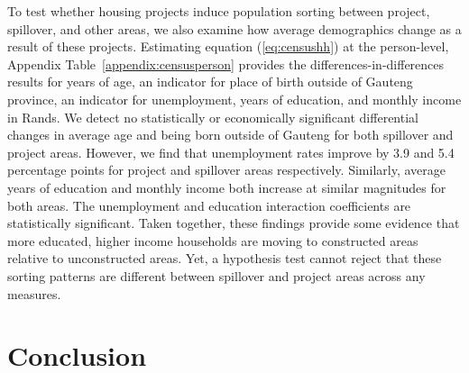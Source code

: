 \documentclass[12pt]{article}
\begin{document}
To test whether housing projects induce population sorting between project, spillover, and other areas, we also examine how average demographics change as a result of these projects.  Estimating equation (\ref{eq:censushh}) at the person-level, Appendix Table~\ref{appendix:censusperson} provides the differences-in-differences results for years of age, an indicator for place of birth outside of Gauteng province, an indicator for unemployment, years of education, and monthly income in Rands.  We detect no statistically or economically significant differential changes in average age and being born outside of Gauteng for both spillover and project areas.  However, we find that unemployment rates improve by 3.9 and 5.4 percentage points for project and spillover areas respectively.  Similarly, average years of education and monthly income both increase at similar magnitudes for both areas.  The unemployment and education interaction coefficients are statistically significant.  Taken together, these findings provide some evidence that more educated, higher income households are moving to constructed areas relative to unconstructed areas.  Yet, a hypothesis test cannot reject that these sorting patterns are different between spillover and project areas across any measures.%

\section{Conclusion}\label{section:discussion}
\end{document}
